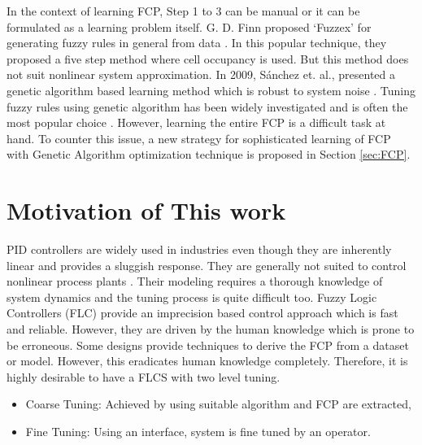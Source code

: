 In the context of learning FCP, Step 1 to 3 can be manual or it can be formulated as a learning problem itself. G. D. Finn proposed `Fuzzex' for generating fuzzy rules in general from data \cite{finn1999learning}. In this popular technique, they proposed a five step method where cell occupancy is used. But this method does not suit nonlinear system approximation. In 2009, Sánchez et. al., presented a genetic algorithm based learning method which is robust to system noise \cite{sanchez2009genetic}. Tuning fuzzy rules using genetic algorithm has been widely investigated and is often the most popular choice \cite{Surmann2001,Sanz2011,Uddin2007a}. However, learning the entire FCP is a difficult task at hand. To counter this issue, a new strategy for sophisticated learning of FCP with Genetic Algorithm optimization technique is proposed in Section \ref{sec:FCP}. 

\section{Motivation of This work}
PID controllers are widely used in industries even though they are inherently linear and provides a sluggish response. They are generally not suited to control nonlinear process plants \cite{Atherton1999a,Bennett1996,Atherton1999}. Their modeling requires a thorough knowledge of system dynamics and the tuning process is quite difficult too. Fuzzy Logic Controllers (FLC) provide an imprecision based control approach which is fast and reliable. However, they are driven by the human knowledge which is prone to be erroneous. Some designs provide techniques to derive the FCP from a dataset or model. However, this eradicates human knowledge completely. Therefore, it is highly desirable to have a FLCS with two level tuning.
\begin{itemize}
	\item Coarse Tuning: Achieved by using suitable algorithm and FCP are extracted,
	\item Fine Tuning: Using an interface, system is fine tuned by an operator.
\end{itemize} 

